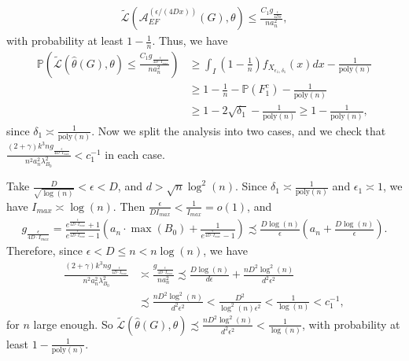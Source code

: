 \documentclass{article}
\newcommand{\thetahat}{\ensuremath{\widehat{\theta}}}
\begin{document}
\begin{align*}
\widetilde{\mathcal{L}}\left(\mathcal{A}_{EF}^{(\epsilon/(4Dx))}(G), \theta\right) \leq \frac{C_1g_{\frac{\epsilon}{4Dx}}}{na_n^2},
\end{align*}
with probability at least $1 - \frac{1}{n}$. Thus, we have
\begin{align*}
\mathbb{P}\left(\widetilde{\mathcal{L}}\left(\thetahat(G), \theta\right) \leq \frac{C_1g_{\frac{\epsilon}{4D\cdot I_{max}}}}{na_n^2}\right) &\geq \int_I\left(1 - \frac{1}{n}\right)f_{X_{\epsilon_1, \delta_1}}(x)dx - \frac{1}{\mathrm{poly}(n)}\\
&\geq 1 - \frac{1}{n} - \mathbb{P}(F_1^c) - \frac{1}{\mathrm{poly}(n)}\\
&\geq 1 - 2\sqrt{\delta_1} - \frac{1}{\mathrm{poly}(n)} \geq 1 - \frac{1}{\mathrm{poly}(n)},
\end{align*}
since $\delta_1 \asymp \frac{1}{\mathrm{poly}(n)}$.
Now we split the analysis into two cases, and we check that $\frac{(2 + \gamma)k^3ng_{\frac{\epsilon}{4D\cdot I_{max}}}}{n^2a_n^2\lambda_{B_0}^2} < c_1^{-1}$ in each case.

Take $\frac{D}{\sqrt{\log(n)}} < \epsilon < D$, and $d > \sqrt{n}\log^2(n)$. Since $\delta_1 \asymp \frac{1}{\mathrm{poly}(n)}$ and $\epsilon_1 \asymp 1$, we have $I_{max} \asymp\log(n)$. Then $\frac{\epsilon}{DI_{max}} < \frac{1}{I_{max}} = o(1)$, and 
\begin{align*}
g_{\frac{\epsilon}{4D\cdot I_{max}}} = \frac{e^{\frac{\epsilon}{4D\cdot I_{max}}} + 1}{e^{\frac{\epsilon}{4D\cdot I_{max}}} - 1}\left(a_n\cdot\max(B_0) + \frac{1}{e^{\frac{\epsilon}{4D\cdot I_{max}}} - 1}\right) \precsim \frac{D\log(n)}{\epsilon}\left(a_n + \frac{D\log(n)}{\epsilon}\right).
\end{align*}
Therefore, since $\epsilon < D \leq n < n\log(n)$, we have
\begin{align*}
\frac{(2 + \gamma)k^3ng_{\frac{\epsilon}{4D\cdot I_{max}}}}{n^2a_n^2\lambda_{B_0}^2} & \asymp \frac{g_{\frac{\epsilon}{4D\cdot I_{max}}}}{na_n^2} \precsim \frac{D\log(n)}{d\epsilon} + \frac{nD^2\log^2(n)}{d^2\epsilon^2} \\
%
& \precsim \frac{nD^2\log^2(n)}{d^2\epsilon^2} < \frac{D^2}{\log^2(n)\epsilon^2} < \frac{1}{\log(n)} < c_1^{-1},
\end{align*}
for $n$ large enough. So $\widetilde{\mathcal{L}}\left(\thetahat(G),  \theta\right) \precsim \frac{nD^2\log^2(n)}{d^2\epsilon^2} < \frac{1}{\log(n)}$, with probability at least $1 - \frac{1}{\mathrm{poly}(n)}$.
\end{document}
